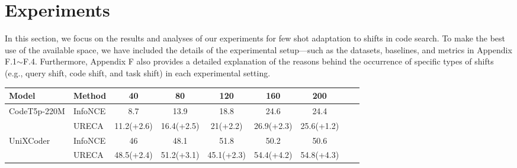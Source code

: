 \section{Experiments}
In this section, we focus on the results and analyses of our experiments
for few shot adaptation to shifts in code search. 
To make the best use of the available space, we have included the details 
of the experimental setup—such as the datasets, baselines, and metrics in Appendix F.1$\sim$F.4. 
Furthermore, Appendix F also provides a detailed explanation of the reasons 
behind the occurrence of specific types of shifts (e.g., query shift, code shift, and task shift) 
in each experimental setting.

\begin{table*}[h]
\def\arraystretch{1.0}
\setlength\tabcolsep{8pt} %
\begin{tabular}{@{}lllcccccc@{}}

\toprule
Model                            & \multicolumn{1}{l}{Method}              & \multicolumn{1}{c}{40}           
& \multicolumn{1}{c}{80}         & \multicolumn{1}{c}{120}               & \multicolumn{1}{c}{160}     
& \multicolumn{1}{c}{200}        \\ \midrule

\multirow{2}{*}{CodeT5p-220M}      
& InfoNCE                   & \multicolumn{1}{c}{8.7}             & \multicolumn{1}{c}{13.9}          
                            & \multicolumn{1}{c}{18.8}             & \multicolumn{1}{c}{24.6}          
                            & \multicolumn{1}{c}{24.4}                  
                            \\ \cmidrule(l){2-7} 
& URECA                     & \multicolumn{1}{c}{11.2(+2.6)}          & \multicolumn{1}{c}{16.4(+2.5)}          
                            & \multicolumn{1}{c}{21(+2.2)}          & \multicolumn{1}{c}{26.9(+2.3)}          
                            & \multicolumn{1}{c}{25.6(+1.2)}                   
                            \\ \midrule

\multirow{2}{*}{UniXCoder} 
& InfoNCE                   & \multicolumn{1}{c}{46}             & \multicolumn{1}{c}{48.1}          
                            & \multicolumn{1}{c}{51.8}             & \multicolumn{1}{c}{50.2}          
                            & \multicolumn{1}{c}{50.6}                   
                            \\ \cmidrule(l){2-7} 
& URECA                     & \multicolumn{1}{c}{48.5(+2.4)}          & \multicolumn{1}{c}{51.2(+3.1)}          
                            & \multicolumn{1}{c}{45.1(+2.3)}          & \multicolumn{1}{c}{54.4(+4.2)}          
                            & \multicolumn{1}{c}{54.8(+4.3)}                  
                            \\ \midrule


\end{tabular}
\end{table*}
